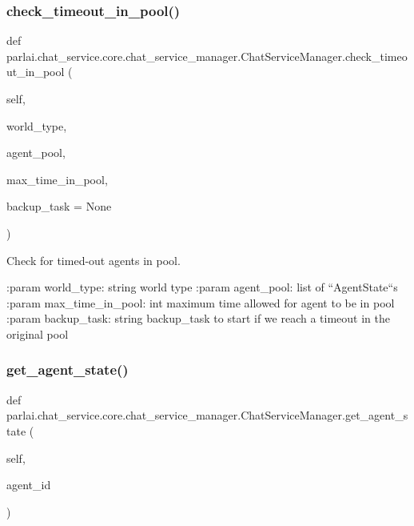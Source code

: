 \subsubsection{\texorpdfstring{check\+\_\+timeout\+\_\+in\+\_\+pool()}{check\_timeout\_in\_pool()}}
{\footnotesize\ttfamily def parlai.\+chat\+\_\+service.\+core.\+chat\+\_\+service\+\_\+manager.\+Chat\+Service\+Manager.\+check\+\_\+timeout\+\_\+in\+\_\+pool (\begin{DoxyParamCaption}\item[{}]{self,  }\item[{}]{world\+\_\+type,  }\item[{}]{agent\+\_\+pool,  }\item[{}]{max\+\_\+time\+\_\+in\+\_\+pool,  }\item[{}]{backup\+\_\+task = {\ttfamily None} }\end{DoxyParamCaption})}

\begin{DoxyVerb}Check for timed-out agents in pool.

:param world_type:
    string world type
:param agent_pool:
    list of ``AgentState``s
:param max_time_in_pool:
    int maximum time allowed for agent to be in pool
:param backup_task:
    string backup_task to start if we reach a timeout in the original pool
\end{DoxyVerb}
 \mbox{\label{classparlai_1_1chat__service_1_1core_1_1chat__service__manager_1_1ChatServiceManager_ac88107eb2a55878dad8ceb4c90acff5b}} 
\subsubsection{\texorpdfstring{get\+\_\+agent\+\_\+state()}{get\_agent\_state()}}
{\footnotesize\ttfamily def parlai.\+chat\+\_\+service.\+core.\+chat\+\_\+service\+\_\+manager.\+Chat\+Service\+Manager.\+get\+\_\+agent\+\_\+state (\begin{DoxyParamCaption}\item[{}]{self,  }\item[{}]{agent\+\_\+id }\end{DoxyParamCaption})}

